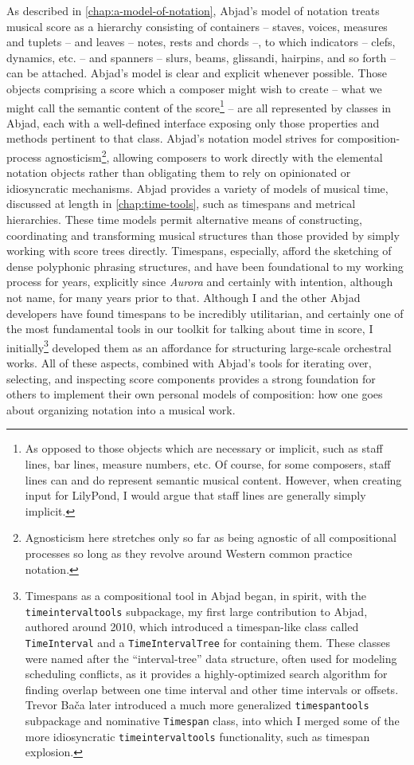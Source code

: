 As described in \autoref{chap:a-model-of-notation}, Abjad's model of notation
treats musical score as a hierarchy consisting of containers -- staves, voices,
measures and tuplets -- and leaves -- notes, rests and chords --, to which
indicators -- clefs, dynamics, etc. -- and spanners -- slurs, beams, glissandi,
hairpins, and so forth -- can be attached. Abjad's model is clear and explicit
whenever possible. Those objects comprising a score which a composer might wish
to create -- what we might call the semantic content of the score\footnote{ As
opposed to those objects which are necessary or implicit, such as staff lines,
bar lines, measure numbers, etc. Of course, for some composers, staff lines can
and do represent semantic musical content. However, when creating input for
LilyPond, I would argue that staff lines are generally simply implicit. } --
are all represented by classes in Abjad, each with a well-defined interface
exposing only those properties and methods pertinent to that class. Abjad's
notation model strives for composition-process agnosticism\footnote{
Agnosticism here stretches only so far as being agnostic of all compositional
processes so long as they revolve around Western common practice notation. },
allowing composers to work directly with the elemental notation objects rather
than obligating them to rely on opinionated or idiosyncratic mechanisms. Abjad
provides a variety of models of musical time, discussed at length in
\autoref{chap:time-tools}, such as timespans and metrical hierarchies. These
time models permit alternative means of constructing, coordinating and
transforming musical structures than those provided by simply working with
score trees directly. Timespans, especially, afford the sketching of dense
polyphonic phrasing structures, and have been foundational to my working
process for years, explicitly since \emph{Aurora} and certainly with intention,
although not name, for many years prior to that. Although I and the other Abjad
developers have found timespans to be incredibly utilitarian, and certainly one
of the most fundamental tools in our toolkit for talking about time in score, I
initially\footnote{ Timespans as a compositional tool in Abjad began, in
spirit, with the \texttt{timeintervaltools} subpackage, my first large
contribution to Abjad, authored around 2010, which introduced a timespan-like
class called \texttt{TimeInterval} and a \texttt{TimeIntervalTree} for
containing them. These classes were named after the \enquote{interval-tree}
data structure, often used for modeling scheduling conflicts, as it provides a
highly-optimized search algorithm for finding overlap between one time interval
and other time intervals or offsets. Trevor Ba\v{c}a later introduced a much
more generalized \texttt{timespantools} subpackage and nominative
\texttt{Timespan} class, into which I merged some of the more idiosyncratic
\texttt{timeintervaltools} functionality, such as timespan explosion. }
developed them as an affordance for structuring large-scale orchestral works.
All of these aspects, combined with Abjad's tools for iterating over,
selecting, and inspecting score components provides a strong foundation for
others to implement their own personal models of composition: how one goes
about organizing notation into a musical work.

